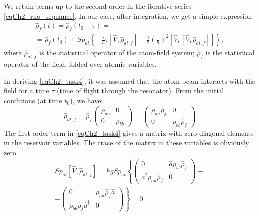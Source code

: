 We retain terms up to the second order in the iterative series \eqref{eqCh2_rho_sequance}. In our case, after integration, we get a simple expression  
\begin{eqnarray}
\hat{\rho}_{f}\left(t\right) =
\hat{\rho}_{f}\left(t_0 + \tau\right) = 
\nonumber \\
= \hat{\rho}_{f}\left(t_0\right) +
Sp_{at}
\left\{
- \frac{i}{\hbar}\tau\left[\hat{V}, \hat{\rho}_{at, f}\right]
- \frac{1}{2} \left(\frac{\tau}{\hbar}\right)^2
\left[\hat{V},\left[\hat{V}, \hat{\rho}_{at, f}\right]\right]
\right\}, 
\label{eqCh2_task4}
\end{eqnarray}
where $\hat{\rho}_{at, f}$ is the statistical operator of the atom-field system; $\hat{\rho}_{f}$ is the statistical operator of the field, folded over atomic variables.
  
In deriving \eqref{eqCh2_task4}, it was assumed that the atom beam interacts with the field for a time $\tau$ (time of flight through the resonator). From the initial conditions (at time $t_0$), we have:  
\begin{equation}
\hat{\rho}_{at, f} = \hat{\rho}_{f}
\left(
\begin{array} {cc}
\rho_{aa} & 0  
\\
0 & \rho_{bb} 
\end{array}
\right) = 
\left(
\begin{array} {cc}
\rho_{aa}\hat{\rho}_{f} & 0  
\\
0 & \rho_{bb}\hat{\rho}_{f}
\end{array}
\right)
\end{equation}
The first-order term in \eqref{eqCh2_task4} gives a matrix with zero diagonal elements in the reservoir variables. The trace of the matrix in these variables is obviously zero  
\begin{eqnarray}
Sp_{at}\left[\hat{V}, \hat{\rho}_{at, f}\right] = 
\hbar g Sp_{at}
\left\{
\left(
\begin{array} {cc}
0 & \hat{a} \rho_{bb}\hat{\rho}_{f}  
\\
\hat{a}^{\dag} \rho_{aa}\hat{\rho}_{f}   & 0
\end{array}
\right)
\right.
-
\nonumber \\
-
\left.
\left(
\begin{array} {cc}
0 & \rho_{aa} \hat{\rho}_{f} \hat{a}   
\\
\rho_{bb} \hat{\rho}_{f} \hat{a}^{\dag}   & 0
\end{array}
\right)
\right\}
= 0.
\label{eqCh2_sp_1}
\end{eqnarray}
